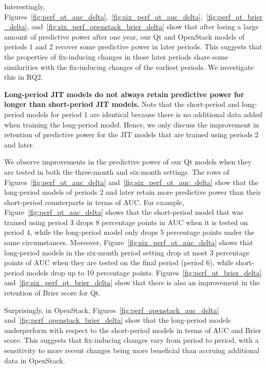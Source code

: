 Interestingly, Figures~\ref{fig:perf_qt_auc_delta},~\ref{fig:six_perf_qt_auc_delta},~\ref{fig:perf_qt_brier_delta}, and~\ref{fig:six_perf_openstack_brier_delta} show that after losing a large amount of predictive power after one year, our {\sc Qt} and {\sc OpenStack} models of periods 1 and 2 recover some predictive power in later periods.
This suggests that the properties of fix-inducing changes in those later periods share some similarities with the fix-inducing changes of the earliest periods.
We investigate this in RQ2.

\textbf{Long-period JIT models do not always retain predictive power for longer than short-period JIT models.}
Note that the short-period and long-period models for period 1 are identical because there is no additional data added when training the long-period model.
Hence, we only discuss the improvement in retention of predictive power for the JIT models that are trained using periods 2 and later.

We observe improvements in the predictive power of our {\sc Qt} models when they are tested in both the three-month and six-month settings.
The rows of Figures~\ref{fig:perf_qt_auc_delta} and~\ref{fig:six_perf_qt_auc_delta} show that the long-period models of periods 2 and later retain more predictive power than their short-period counterparts in terms of AUC.
For example, Figure~\ref{fig:perf_qt_auc_delta} shows that the short-period model that was trained using period 3 drops 8 percentage points in AUC when it is tested on period 4, while the long-period model only drops 5 percentage points under the same circumstances.
Moreover, Figure~\ref{fig:six_perf_qt_auc_delta} shows that long-period models in the six-month period setting drop at most 3 percentage points of AUC when they are tested on the final period (period 6), while short-period models drop up to 10 percentage points.
Figures~\ref{fig:perf_qt_brier_delta} and~\ref{fig:six_perf_qt_brier_delta} show that there is also an improvement in the retention of Brier score for {\sc Qt}.

Surprisingly, in {\sc OpenStack}, Figures~\ref{fig:perf_openstack_auc_delta} and~\ref{fig:perf_openstack_brier_delta} show
 that the long-period models underperform with respect to the short-period models in terms of AUC and Brier score.
 This suggests that fix-inducing changes vary from period to period, with a sensitivity to more recent changes being more beneficial than accruing additional data in {\sc OpenStack}.


